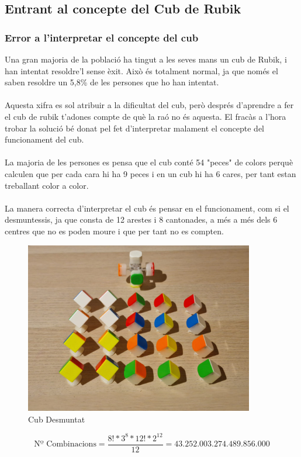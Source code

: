 \subsection{Entrant al concepte del Cub de Rubik}

\subsubsection{Error a l'interpretar el concepte del cub}

Una gran majoria de la població ha tingut a les seves mans un cub de Rubik, i han intentat resoldre'l sense èxit. Això és totalment normal, ja que només el saben resoldre un 5,8\% de les persones que ho han intentat\cite{redbull-cub}.
\\ \\Aquesta xifra es sol atribuir a la dificultat del cub, però després d'aprendre a fer el cub de rubik t'adones compte de què la raó no és aquesta. El fracàs a l'hora trobar la solució bé donat pel fet d'interpretar malament el concepte del funcionament del cub.
\\ \\La majoria de les persones es pensa que el cub conté 54 "peces" de colors perquè calculen que per cada cara hi ha 9 peces i en un cub hi ha 6 cares, per tant estan treballant color a color.
\\ \\La manera correcta d'interpretar el cub és pensar en el funcionament, com si el desmuntessis, ja que consta de 12 arestes i 8 cantonades, a més a més dels 6 centres que no es poden moure i que per tant no es compten.

\begin{figure}[h]
    \centering
    \includegraphics[width=10cm]{img/figures/cub-desmontat.jpg}
    \caption{Cub Desmuntat}
    \label{fig:cub-desmuntat}
\end{figure}

$$ \textrm{Nº Combinacions} = \frac{8!*3^8*12!*2^{12}}{12}= 43.252.003.274.489.856.000 $$